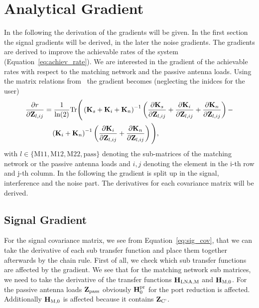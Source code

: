 \chapter{Analytical Gradient}

In the following the derivation of the gradients will be given.
In the first section the signal gradients will be derived, in the later the noise gradients.
The gradients are derived to improve the achievable rates of the system (Equation~\eqref{eq:achiev_rate}).
We are interested in the gradient of the achievable rates with respect to the matching network and the passive antenna loads.
Using the matrix relations from~\cite{Codebook12} the gradient becomes (neglecting the inidces for the user)
\begin{align}
\label{eq:gradient}\nonumber
\frac{\partial r}{\partial\mathbf{Z}_{l,ij}} &= \frac{1}{\text{ln}(2)} 
\text{Tr}\Bigg(\left(\mathbf{K}_s + \mathbf{K}_i + \mathbf{K}_n\right)^{-1}
\left(\frac{\partial\mathbf{K}_s}{\partial\mathbf{Z}_{l,ij}}+
 \frac{\partial\mathbf{K}_i}{\partial\mathbf{Z}_{l,ij}}+
 \frac{\partial\mathbf{K}_n}{\partial\mathbf{Z}_{l,ij}}\right)-\\
 &\quad\left(\mathbf{K}_i+\mathbf{K}_n\right)^{-1}
 \left(\frac{\partial\mathbf{K}_i}{\partial\mathbf{Z}_{l,ij}}+
 	\frac{\partial\mathbf{K}_n}{\partial\mathbf{Z}_{l,ij}}\right)\Bigg),
\end{align}
with $l\in\{\text{M}11,\text{M}12,\text{M}22,\text{pass}\}$ denoting the sub-matrices of the matching network or the passive antenna loads and $i,j$ denoting the element in the i-th row and j-th column.
In the following the gradient is split up in the signal, interference and the noise part.
The derivatives for each covariance matrix will be derived.

\section{Signal Gradient}
\label{sec:signal_gradient}
 For the signal covariance matrix, we see from Equation~\eqref{eq:sig_cov}, that we can take the derivative of each sub transfer function and place them together afterwards by the chain rule.
First of all, we check which sub transfer functions are affected by the gradient.
We see that for the matching network sub matrices, we need to take the derivative of the transfer functions $\mathbf{H}_\text{LNA,M}$ and $\mathbf{H}_\text{M,0}$.
For the passive antenna loads $\mathbf{Z}_\text{pass}$ obviously $\mathbf{H}_0^{\text{pr}}$ for the port reduction is affected.
Additionally $\mathbf{H}_\text{M,0}$ is affected because it contains $\mathbf{Z}_\text{C'}$.

